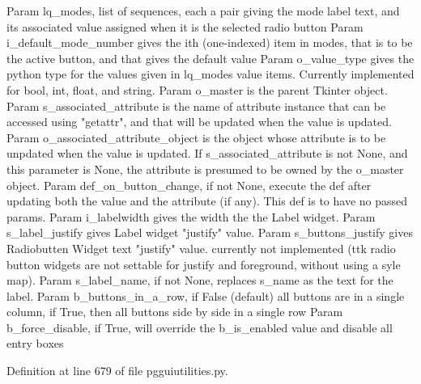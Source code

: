 \begin{DoxyVerb}Param lq_modes, list of sequences, each a pair
    giving the mode label text, and its associated value
    assigned when it is the selected radio button
Param i_default_mode_number gives the ith (one-indexed)
    item in modes, that is to be the active button,
    and that gives the default value
Param o_value_type gives the python type for the values
    given in lq_modes value items.  Currently implemented
    for bool, int, float, and string.
Param o_master is the parent Tkinter object.
Param s_associated_attribute is the name of 
    attribute instance that can be accessed
    using "getattr", and that will be
    updated when the value is updated.
Param o_associated_attribute_object is the object whose attribute
    is to be unpdated when the value is updated.  If
    s_associated_attribute is not None, and this parameter
    is None, the attribute is presumed to be
    owned by the o_master object.
Param def_on_button_change, if not None, execute the def
    after updating both the value and the attribute (if any).
    This def is to have no passed params.
Param i_labelwidth gives the width the the Label widget.
Param s_label_justify gives Label widget "justify" value.
Param s_buttons_justify gives Radiobutten Widget text "justify" value.
currently not implemented (ttk radio button widgets are not
settable for justify and foreground, without using a syle map).
Param s_label_name, if not None, replaces s_name as the text for the label.
Param b_buttons_in_a_row, if False (default) all buttons are in a single column, if True,
then all buttons side by side in a single row
Param b_force_disable, if True, will override the b_is_enabled value and disable all entry 
      boxes
\end{DoxyVerb}
 

Definition at line 679 of file pgguiutilities.\+py.


